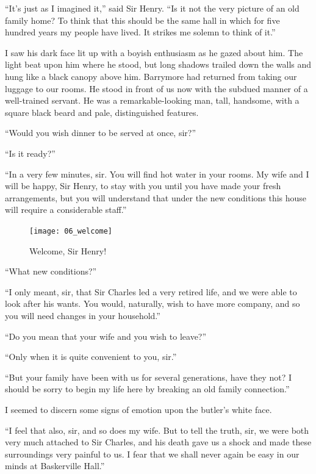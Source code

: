\documentclass[paper=a5,BCOR=7mm,twoside,DIV=calc,12pt,usegeometry,openany,chapterprefix,endperiod,headings=big]{scrbook} %
\begin{document}
\enquote{It's just as I imagined it,} said Sir Henry. \enquote{Is it not the very picture of an old family home? To think that this should be the same hall in which for five hundred years my people have lived. It strikes me solemn to think of it.}

I saw his dark face lit up with a boyish enthusiasm as he gazed about him. The light beat upon him where he stood, but long shadows trailed down the walls and hung like a black canopy above him. Barrymore had returned from taking our luggage to our rooms. He stood in front of us now with the subdued manner of a well-trained servant. He was a remarkable-looking man, tall, handsome, with a square black beard and pale, distinguished features.

\enquote{Would you wish dinner to be served at once, sir?}

\enquote{Is it ready?}

\enquote{In a very few minutes, sir. You will find hot water in your rooms. My wife and I will be happy, Sir Henry, to stay with you until you have made your fresh arrangements, but you will understand that under the new conditions this house will require a considerable staff.}

\begin{figure}[hp!]
\centering
\texttt{[image: 06\_welcome]}
\caption{Welcome, Sir Henry!}
\end{figure}

\enquote{What new conditions?}

\enquote{I only meant, sir, that Sir Charles led a very retired life, and we were able to look after his wants. You would, naturally, wish to have more company, and so you will need changes in your household.}

\enquote{Do you mean that your wife and you wish to leave?}

\enquote{Only when it is quite convenient to you, sir.}

\enquote{But your family have been with us for several generations, have they not? I should be sorry to begin my life here by breaking an old family connection.}

I seemed to discern some signs of emotion upon the butler's white face.

\enquote{I feel that also, sir, and so does my wife. But to tell the truth, sir, we were both very much attached to Sir Charles, and his death gave us a shock and made these surroundings very painful to us. I fear that we shall never again be easy in our minds at Baskerville Hall.}
\end{document}
